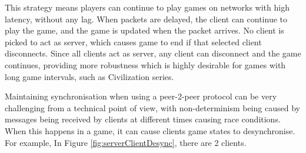 This strategy means players can continue to play games on networks with high latency, without any lag. When packets are delayed, the client can continue to play the game, and the game is updated when the packet arrives.
No client is picked to act as server, which causes game to end if that selected client disconnects.
Since all clients act as server, any client can disconnect and the game continues, providing more robustness which is highly desirable for games with long game intervals, such as Civilization series\cite{civilizationInMyPants}.



Maintaining synchronisation when using a peer-2-peer protocol can be very challenging from a technical point of view, with non-determinism being caused by messages being received by clients at different times causing race conditions.
When this happens in a game, it can cause clients game states to desynchronise.
For example, In Figure \ref{fig:serverClientDesync}, there are 2 clients.










